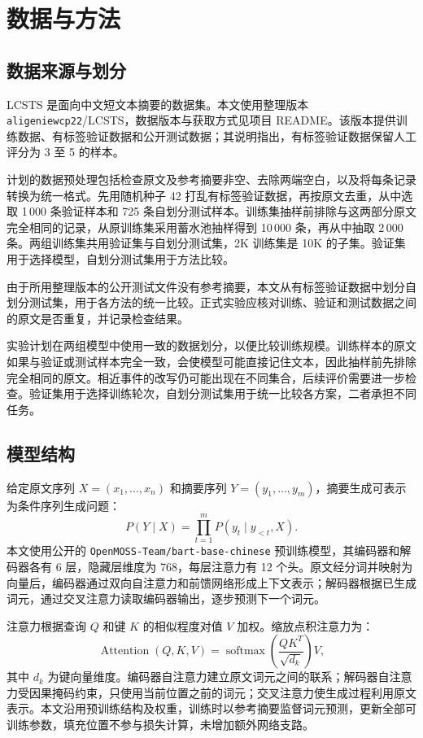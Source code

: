 \documentclass{sdxxpaper}
\begin{document}
\section{数据与方法}
\subsection{数据来源与划分}
LCSTS 是面向中文短文本摘要的数据集\cite{lcsts}。本文使用整理版本 \texttt{aligeniewcp22}/LCSTS，数据版本与获取方式见项目 README。该版本提供训练数据、有标签验证数据和公开测试数据；其说明指出，有标签验证数据保留人工评分为 3 至 5 的样本\cite{dataset}。

计划的数据预处理包括检查原文及参考摘要非空、去除两端空白，以及将每条记录转换为统一格式。先用随机种子 42 打乱有标签验证数据，再按原文去重，从中选取 1\,000 条验证样本和 725 条自划分测试样本。训练集抽样前排除与这两部分原文完全相同的记录，从原训练集采用蓄水池抽样得到 10\,000 条，再从中抽取 2\,000 条。两组训练集共用验证集与自划分测试集，2K 训练集是 10K 的子集。验证集用于选择模型，自划分测试集用于方法比较。

由于所用整理版本的公开测试文件没有参考摘要，本文从有标签验证数据中划分自划分测试集，用于各方法的统一比较。正式实验应核对训练、验证和测试数据之间的原文是否重复，并记录检查结果。

实验计划在两组模型中使用一致的数据划分，以便比较训练规模。训练样本的原文如果与验证或测试样本完全一致，会使模型可能直接记住文本，因此抽样前先排除完全相同的原文。相近事件的改写仍可能出现在不同集合，后续评价需要进一步检查。验证集用于选择训练轮次，自划分测试集用于统一比较各方案，二者承担不同任务。

\subsection{模型结构}
给定原文序列 $X=(x_1,\ldots,x_n)$ 和摘要序列 $Y=(y_1,\ldots,y_m)$，摘要生成可表示为条件序列生成问题：
\begin{equation}
P(Y\mid X)=\prod_{t=1}^{m}P(y_t\mid y_{<t},X).
\end{equation}
本文使用公开的 \texttt{OpenMOSS-Team/bart-base-chinese} 预训练模型\cite{model}，其编码器和解码器各有 6 层，隐藏层维度为 768，每层注意力有 12 个头。原文经分词并映射为向量后，编码器通过双向自注意力和前馈网络形成上下文表示；解码器根据已生成词元，通过交叉注意力读取编码器输出，逐步预测下一个词元。

注意力根据查询 $Q$ 和键 $K$ 的相似程度对值 $V$ 加权。缩放点积注意力为：
\begin{equation}
\operatorname{Attention}(Q,K,V)=\operatorname{softmax}\!\left(\frac{QK^{T}}{\sqrt{d_k}}\right)V,
\end{equation}
其中 $d_k$ 为键向量维度\cite{transformer}。编码器自注意力建立原文词元之间的联系；解码器自注意力受因果掩码约束，只使用当前位置之前的词元；交叉注意力使生成过程利用原文表示。本文沿用预训练结构及权重，训练时以参考摘要监督词元预测，更新全部可训练参数，填充位置不参与损失计算，未增加额外网络支路。
\end{document}
